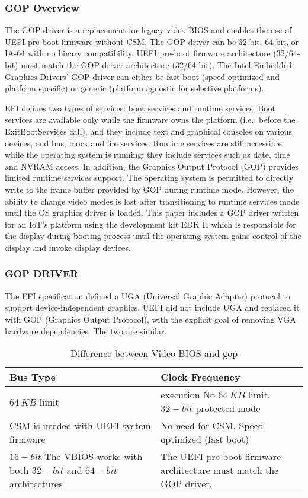 \subsubsection{GOP Overview}
The GOP driver is a replacement for legacy video BIOS and enables the use of UEFI pre-boot firmware without CSM. The GOP driver can be 32-bit, 64-bit, or IA-64 with no binary compatibility. UEFI pre-boot firmware architecture (32/64-bit) must match the GOP driver architecture (32/64-bit). The Intel Embedded Graphics Drivers' GOP driver can either be fast boot (speed optimized and platform specific) or generic (platform agnostic for selective platforms).

EFI defines two types of services: boot services and runtime services. Boot services are available only while the firmware owns the platform (i.e., before the ExitBootServices call), and they include text and graphical consoles on various devices, and bus, block and file services. Runtime services are still accessible while the operating system is running; they include services such as date, time and NVRAM access. In addition, the Graphics Output Protocol (GOP) provides limited runtime services support. The operating system is permitted to directly write to the frame buffer provided by GOP during runtime mode. However, the ability to change video modes is lost after transitioning to runtime services mode until the OS graphics driver is loaded. This paper includes a GOP driver written for an IoT's platform using the development kit EDK II which is responsible for the display during booting process until the operating system gains control of the display and invoke display devices.

\subsubsection{GOP DRIVER}
The EFI specification defined a UGA (Universal Graphic Adapter) protocol to support device-independent graphics. UEFI did not include UGA and replaced it with GOP (Graphics Output Protocol), with the explicit goal of removing VGA hardware dependencies. The two are similar.


\begin{table}
	\centering
	\renewcommand\arraystretch{2}
	\caption{Difference between Video BIOS and \gls{gop}}\label{table:video-bios-vs-gop}
	\begin{tabular}{p{5cm} | p{5cm}}
		Bus Type & Clock Frequency
		\\ \hline \hline
		$ 64 \ KB $ limit & execution No $ 64 \ KB $ limit. $ 32-bit $ protected mode
		\\ \hline
		CSM is needed with UEFI system firmware & No need for CSM. Speed optimized (fast boot)
		\\ \hline
		$ 16-bit $ The VBIOS works with both $ 32-bit $ and $ 64-bit $ architectures & The UEFI pre-boot firmware architecture must match the GOP driver.
		\\ \hline
	\end{tabular}
\end{table}

